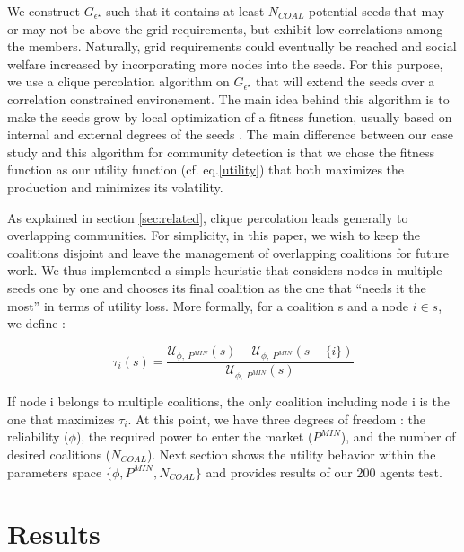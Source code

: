 \documentclass[conference]{IEEEtran}
\begin{document}
We construct $ G_{\epsilon^{\star}} $ such that it contains at least $ N_{COAL} $ potential seeds that may or may not be above the grid requirements, but exhibit low correlations among the members. Naturally, grid requirements could eventually be reached and social welfare increased by incorporating more nodes into the seeds. For this purpose, we use a clique percolation algorithm on $ G_{\epsilon^{\star}} $ that will extend the seeds over a correlation constrained environement. The main idea behind this algorithm is to make the seeds grow by local optimization of a fitness function, usually based on internal and external degrees of the seeds \cite{Lancichinetti}. The main difference between our case study and this algorithm for community detection is that we chose the fitness function as our utility function (cf. eq.\eqref{utility}) that both maximizes the production and minimizes its volatility.  

As explained in section \ref{sec:related}, clique percolation leads generally to overlapping communities. For simplicity, in this paper, we wish to keep the coalitions disjoint and  leave the management of overlapping coalitions for future work. We thus implemented a simple heuristic that considers nodes in multiple seeds one by one and chooses its final coalition as the one that “needs it the most” in terms of utility loss. More formally, for a coalition s and a node $ i \in s $, we define :

\begin{equation}
\tau_{i}(s) = \dfrac{\mathcal{U}_{\phi,\ P^{MIN}}(s) - \mathcal{U}_{\phi,\ P^{MIN}}(s-\{i\}) }{\mathcal{U}_{\phi,\ P^{MIN}}(s)}
\label{tau}
\end{equation}

If node i belongs to  multiple coalitions, the only coalition including node i is the one that maximizes $ \tau_{i} $. At this point, we have three degrees of freedom : the reliability ($ \phi $), the required power to enter the market ($P^{MIN}$), and the number of desired coalitions ($ N_{COAL} $). Next section shows the utility behavior within the parameters space $ \{\phi,P^{MIN},N_{COAL} \} $ and provides results of our 200 agents test.

\section{Results}
\label{sec:results}
\end{document}
